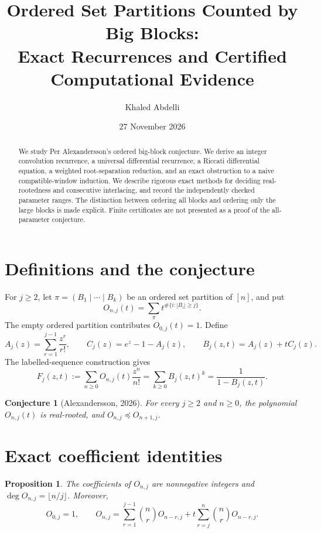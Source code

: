 \documentclass[11pt]{article}
\title{Ordered Set Partitions Counted by Big Blocks:\\
Exact Recurrences and Certified Computational Evidence}
\author{Khaled Abdelli}
\date{27 November 2026}
\newtheorem{proposition}[theorem]{Proposition}
\newtheorem{conjecture}[theorem]{Conjecture}
\theoremstyle{definition}
\newcommand{\OO}{O}
\newcommand{\interl}{\mathrel{\preceq}}
\begin{document}
\maketitle

\begin{abstract}
We study Per Alexandersson's ordered big-block conjecture.  We derive an
integer convolution recurrence, a universal differential recurrence, a
Riccati differential equation, a weighted root-separation reduction, and an
exact obstruction to a naive compatible-window induction.
We describe rigorous exact
methods for deciding real-rootedness and consecutive interlacing, and record
the independently checked parameter ranges.  The distinction between ordering
all blocks and ordering only the large blocks is made explicit.  Finite
certificates are not presented as a proof of the all-parameter conjecture.
\end{abstract}

\section{Definitions and the conjecture}

For \(j\ge2\), let \(\pi=(B_1\mid\cdots\mid B_k)\) be an ordered set partition
of \([n]\), and put
\[
\OO_{n,j}(t)=\sum_{\pi}t^{\#\{i:|B_i|\ge j\}}.
\]
The empty ordered partition contributes \(\OO_{0,j}(t)=1\).  Define
\[
A_j(z)=\sum_{r=1}^{j-1}\frac{z^r}{r!},\qquad
C_j(z)=e^z-1-A_j(z),\qquad
B_j(z,t)=A_j(z)+tC_j(z).
\]
The labelled-sequence construction gives
\[
F_j(z,t):=\sum_{n\ge0}\OO_{n,j}(t)\frac{z^n}{n!}
=\sum_{k\ge0}B_j(z,t)^k
=\frac1{1-B_j(z,t)}.
\]

\begin{conjecture}[Alexandersson, 2026]
For every \(j\ge2\) and \(n\ge0\), the polynomial \(\OO_{n,j}(t)\) is
real-rooted, and \(\OO_{n,j}\interl\OO_{n+1,j}\).
\end{conjecture}

\section{Exact coefficient identities}

\begin{proposition}
The coefficients of \(\OO_{n,j}\) are nonnegative integers and
\(\deg\OO_{n,j}=\lfloor n/j\rfloor\).  Moreover,
\[
\OO_{0,j}=1,\qquad
\OO_{n,j}=
\sum_{r=1}^{j-1}\binom nr\OO_{n-r,j}
+t\sum_{r=j}^{n}\binom nr\OO_{n-r,j}.
\]
\end{proposition}
\end{document}
